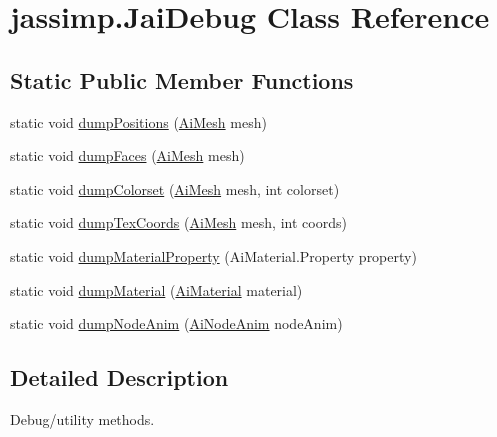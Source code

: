 \hypertarget{classjassimp_1_1_jai_debug}{\section{jassimp.\+Jai\+Debug Class Reference}
\label{classjassimp_1_1_jai_debug}
}
\subsection*{Static Public Member Functions}
\begin{DoxyCompactItemize}
\item 
static void \hyperlink{classjassimp_1_1_jai_debug_acd07a12e63cc6ee32c41a9d57f610f47}{dump\+Positions} (\hyperlink{classjassimp_1_1_ai_mesh}{Ai\+Mesh} mesh)
\item 
static void \hyperlink{classjassimp_1_1_jai_debug_abeab51b27d7cc0469c3dbe513d1ba012}{dump\+Faces} (\hyperlink{classjassimp_1_1_ai_mesh}{Ai\+Mesh} mesh)
\item 
static void \hyperlink{classjassimp_1_1_jai_debug_adf1d6afd36f6bce23ab03fbd771b6887}{dump\+Colorset} (\hyperlink{classjassimp_1_1_ai_mesh}{Ai\+Mesh} mesh, int colorset)
\item 
static void \hyperlink{classjassimp_1_1_jai_debug_a6cb70bfa073bec664f0337aa26e653f9}{dump\+Tex\+Coords} (\hyperlink{classjassimp_1_1_ai_mesh}{Ai\+Mesh} mesh, int coords)
\item 
static void \hyperlink{classjassimp_1_1_jai_debug_a37daf8530c96b02afb27bf0576c1b48b}{dump\+Material\+Property} (Ai\+Material.\+Property property)
\item 
static void \hyperlink{classjassimp_1_1_jai_debug_a78eacfd43cd07b55780ee34f2f20a245}{dump\+Material} (\hyperlink{classjassimp_1_1_ai_material}{Ai\+Material} material)
\item 
static void \hyperlink{classjassimp_1_1_jai_debug_a203c1449cc36f3867be433a3b0902812}{dump\+Node\+Anim} (\hyperlink{classjassimp_1_1_ai_node_anim}{Ai\+Node\+Anim} node\+Anim)
\end{DoxyCompactItemize}


\subsection{Detailed Description}
Debug/utility methods. 

